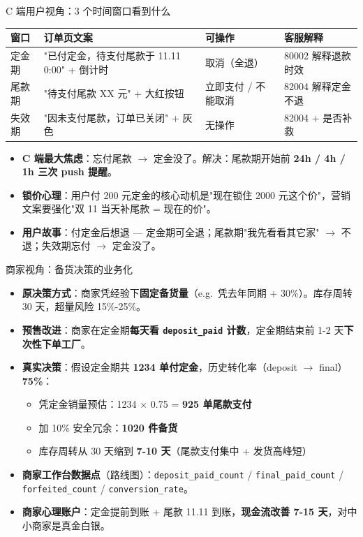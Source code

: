 \documentclass[aspectratio=169,11pt]{beamer}
\begin{document}
\begin{frame}[shrink]{C 端用户视角：3 个时间窗口看到什么}
{\footnotesize
\begin{tabular}{@{}lp{4cm}p{3cm}p{3.5cm}@{}}
\toprule
窗口 & 订单页文案 & 可操作 & 客服解释 \\
\midrule
定金期 & "已付定金，待支付尾款于 11.11 0:00" + 倒计时 & 取消（全退） & 80002 解释退款时效 \\
尾款期 & "待支付尾款 XX 元" + 大红按钮 & 立即支付 / 不能取消 & 82004 解释定金不退 \\
失效期 & "因未支付尾款，订单已关闭" + 灰色 & 无操作 & 82004 + 是否补救 \\
\bottomrule
\end{tabular}}
\vspace{2mm}
\begin{itemize}\small
  \item \textbf{C 端最大焦虑}：忘付尾款 $\to$ 定金没了。解决：尾款期开始前 \textbf{24h / 4h / 1h 三次 push 提醒}。
  \item \textbf{锁价心理}：用户付 200 元定金的核心动机是"现在锁住 2000 元这个价"，营销文案要强化"双 11 当天补尾款 = 现在的价"。
  \item \textbf{用户故事}：付定金后想退 — 定金期可全退；尾款期"我先看看其它家" $\to$ 不退；失效期忘付 $\to$ 定金没了。
\end{itemize}
\end{frame}

\begin{frame}[shrink]{商家视角：备货决策的业务化}
\begin{itemize}\small
  \item \textbf{原决策方式}：商家凭经验下\textbf{固定备货量}（e.g.\ 凭去年同期 + 30\%）。库存周转 30 天，超量风险 15\%-25\%。
  \item \textbf{预售改进}：商家在定金期\textbf{每天看 \texttt{deposit\_paid} 计数}，定金期结束前 1-2 天\textbf{下次性下单工厂}。
  \item \textbf{真实决策}：假设定金期共 \textbf{1234 单付定金}，历史转化率（deposit $\to$ final）\textbf{75\%}：
    \begin{itemize}\footnotesize
      \item 凭定金销量预估：1234 $\times$ 0.75 = \textbf{925 单尾款支付}
      \item 加 10\% 安全冗余：\textbf{1020 件备货}
      \item 库存周转从 30 天缩到 \textbf{7-10 天}（尾款支付集中 + 发货高峰短）
    \end{itemize}
  \item \textbf{商家工作台数据点}（路线图）：\texttt{deposit\_paid\_count} / \texttt{final\_paid\_count} / \texttt{forfeited\_count} / \texttt{conversion\_rate}。
  \item \textbf{商家心理账户}：定金提前到账 + 尾款 11.11 到账，\textbf{现金流改善 7-15 天}，对中小商家是真金白银。
\end{itemize}
\end{frame}
\end{document}
